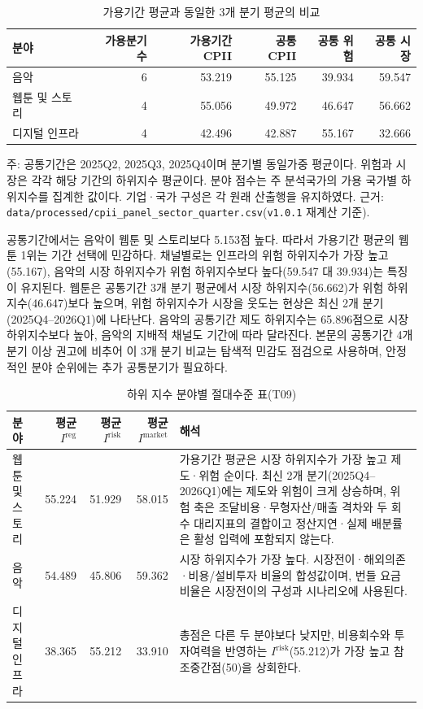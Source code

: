 \documentclass[11pt,a4paper]{report}
\begin{document}
\begin{table}[H]
\centering\small
\caption{가용기간 평균과 동일한 3개 분기 평균의 비교}
\label{tab:common_window_revision}
\begin{tabular}{L{3.0cm}rrrrr}
\toprule
{}
분야 & 가용분기 수 & 가용기간 CPII & 공통 CPII & 공통 위험 & 공통 시장 \\
\midrule
음악 & 6 & 53.219 & 55.125 & 39.934 & 59.547 \\
웹툰 및 스토리 & 4 & 55.056 & 49.972 & 46.647 & 56.662 \\
디지털 인프라 & 4 & 42.496 & 42.887 & 55.167 & 32.666 \\
\bottomrule
\end{tabular}
{\par\raggedright\footnotesize 주: 공통기간은 2025Q2, 2025Q3, 2025Q4이며 분기별 동일가중 평균이다. 위험과 시장은 각각 해당 기간의 하위지수 평균이다. 분야 점수는 주 분석국가의 가용 국가별 하위지수를 집계한 값이다. 기업·국가 구성은 각 원래 산출행을 유지하였다. 근거: \nolinkurl{data/processed/cpii_panel_sector_quarter.csv}(\texttt{v1.0.1} 재계산 기준).\par}
\end{table}

공통기간에서는 음악이 웹툰 및 스토리보다 5.153점 높다. 따라서 가용기간 평균의 웹툰 1위는 기간 선택에 민감하다. 채널별로는 인프라의 위험 하위지수가 가장 높고(55.167), 음악의 시장 하위지수가 위험 하위지수보다 높다(59.547 대 39.934)는 특징이 유지된다. 웹툰은 공통기간 3개 분기 평균에서 시장 하위지수(56.662)가 위험 하위지수(46.647)보다 높으며, 위험 하위지수가 시장을 웃도는 현상은 최신 2개 분기(2025Q4--2026Q1)에 나타난다. 음악의 공통기간 제도 하위지수는 65.896점으로 시장 하위지수보다 높아, 음악의 지배적 채널도 기간에 따라 달라진다. 본문의 공통기간 4개 분기 이상 권고에 비추어 이 3개 분기 비교는 탐색적 민감도 점검으로 사용하며, 안정적인 분야 순위에는 추가 공통분기가 필요하다.


\begin{table}[H]
\centering
\small
\caption{하위 지수 분야별 절대수준 표(T09)}
\label{tab:results_cpii_means}
\begin{tabular}{lrrrp{5.6cm}}
\toprule
\rowcolor{ReportTableHead}
분야 & 평균 $I^{\mathrm{reg}}$ & 평균 $I^{\mathrm{risk}}$ & 평균 $I^{\mathrm{market}}$ & 해석 \\
\midrule
웹툰 및 스토리 & 55.224 & 51.929 & 58.015 & 가용기간 평균은 시장 하위지수가 가장 높고 제도·위험 순이다. 최신 2개 분기(2025Q4--2026Q1)에는 제도와 위험이 크게 상승하며, 위험 축은 조달비용·무형자산/매출 격차와 두 회수 대리지표의 결합이고 정산지연·실제 배분률은 활성 입력에 포함되지 않는다. \\
음악 & 54.489 & 45.806 & 59.362 & 시장 하위지수가 가장 높다. 시장전이·해외의존·비용/설비투자 비율의 합성값이며, 번들 요금비율은 시장전이의 구성과 시나리오에 사용된다. \\
디지털 인프라 & 38.365 & 55.212 & 33.910 & 총점은 다른 두 분야보다 낮지만, 비용회수와 투자여력을 반영하는 $I^{\mathrm{risk}}$(55.212)가 가장 높고 참조중간점(50)을 상회한다. \\
\bottomrule
\end{tabular}
\end{table}
\end{document}
